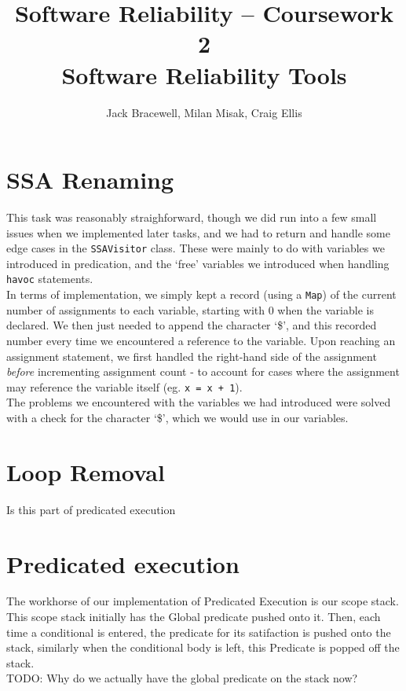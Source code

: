 \documentclass[11pt]{article}
\title{Software Reliability -- Coursework 2 \\ Software Reliability Tools}
\author{Jack Bracewell, Milan Misak, Craig Ellis}
\date{}
\begin{document}
\maketitle

\section{SSA Renaming}

This task was reasonably straighforward, though we did run into a few small issues when we implemented later
tasks, and we had to return and handle some edge cases in the \verb|SSAVisitor| class. These were mainly to do
with variables we introduced in predication, and the `free' variables we introduced when handling \verb|havoc|
statements. \\

In terms of implementation, we simply kept a record (using a \verb|Map|) of the current number of assignments to
each variable, starting with 0 when the variable is declared. We then just needed to append the character `\$',
and this recorded number every time we encountered a reference to the variable. Upon reaching an assignment
statement, we first handled the right-hand side of the assignment \emph{before} incrementing assignment count -
to account for cases where the assignment may reference the variable itself (eg. \verb|x = x + 1|). \\

The problems we encountered with the variables we had introduced were solved with a check for the character `\$',
which we would use in our variables.

\section{Loop Removal}
Is this part of predicated execution
\section{Predicated execution}
The workhorse of our implementation of Predicated Execution is our scope stack. This scope stack initially
has the Global predicate pushed onto it. Then, each time a conditional is entered, the predicate for its
satifaction is pushed onto the stack, similarly when the conditional body is left, this Predicate is
popped off the stack.\\

TODO: Why do we actually have the global predicate on the stack now?
\end{document}
